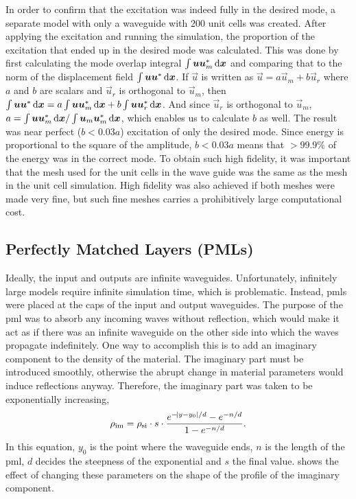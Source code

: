 In order to confirm that the excitation was indeed fully in the desired mode, a
separate model with only a waveguide with 200 unit cells was created.
After applying the excitation and running the simulation,
the proportion of the excitation that ended up in the desired mode was
calculated.
This was done by first calculating the mode overlap integral
$\int \vec u \vec u_m^* \dl{\vec x}$
and comparing that to the norm of the displacement field
$\int \vec u \vec u^* \dl{\vec x}$.
If $\vec u$ is written as $\vec u = a \vec u_m + b \vec u_r$ where $a$ and $b$
are scalars and $\vec u_r$ is orthogonal to $\vec u_m$,
then
$\int \vec u \vec u^* \dl{\vec x} = a\int \vec u \vec u_m^*\dl{\vec x} + b\int
\vec u \vec u_r^*\dl{\vec x}$.
And since $\vec u_r$ is orthogonal to $\vec u_m$,
$a = \int \vec u \vec u_m^*\dl{\vec x} / \int \vec u_m \vec u_m^*\dl{\vec x}$,
which enables us to calculate $b$ as well.
The result was near perfect ($b < 0.03 a$) excitation of only the desired mode.
Since energy is proportional to
the square of the amplitude, $b < 0.03 a$ means that $>99.9 \%$ of the energy was
in the correct mode.
To obtain such high fidelity, it was important that the mesh used for the
unit cells in the wave guide was the same as the mesh in the unit cell
simulation.
High fidelity was also achieved if both meshes were made very fine, but such
fine meshes carries a prohibitively large computational cost.

\subsection{Perfectly Matched Layers (PMLs)}

Ideally, the input and outputs are infinite waveguides.
Unfortunately, infinitely large models require infinite simulation time, which
is problematic.
Instead, \glspl{pml} were placed at the caps of the input and output waveguides.
The purpose of the \gls{pml} was to absorb any incoming waves without reflection,
which would make it act as if there was an infinite waveguide on the other side
into which the waves propagate indefinitely.
One way to accomplish this is to add an imaginary component to the density of
the material.
The imaginary part must be introduced smoothly,
otherwise the abrupt change in material
parameters would induce reflections anyway.
Therefore, the imaginary part was taken to be exponentially increasing,
\begin{equation}\label{eq:rho_im}
	\rho_\text{im} = \rho_\text{si} \cdot s \cdot
	\frac{e^{-\abs{y-y_0} / d} - e^{-n/d}}{1 - e^{-n/d}}.
\end{equation}
In this equation, $y_0$ is the point where the waveguide ends,
$n$ is the length of the \gls{pml}, $d$ decides the steepness of the
exponential and $s$ the final value.
 shows the effect of changing these parameters on the
shape of the profile of the imaginary component.

